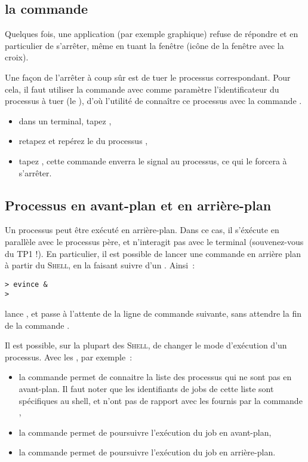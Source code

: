 \documentclass[11pt,a4paper]{article}
\newcommand{\shell}{\textsc{Shell}}
\begin{document}
\subsection{la commande }

Quelques fois, une application (par exemple graphique) refuse de répondre et en
particulier de s'arrêter, même en tuant la fenêtre (icône de la fenêtre avec
la croix).

Une façon de l'arrêter à coup sûr est de tuer le
processus correspondant. Pour cela, il faut utiliser la commande  avec
comme paramètre l'identificateur du processus à tuer (le ), d'où
l'utilité de connaître ce processus avec la commande .

\begin{maw}
\begin{itemize}
  \item dans un terminal, tapez ,
  \item retapez  et repérez le  du processus
        ,
  \item tapez , cette commande enverra le signal 
        au processus, ce qui le forcera à s'arrêter.
\end{itemize}
\end{maw}

\subsection{Processus en avant-plan et en arrière-plan}

Un processus peut être exécuté en arrière-plan. Dans ce cas, il s'éxécute en
parallèle avec le processus père, et n'interagit pas avec le terminal
(souvenez-vous du TP1 !).
En particulier, il est possible de lancer une commande en arrière plan à
partir du \shell, en la faisant suivre d'un \cmd{\&}. Ainsi~:

\begin{verbatim}
> evince &
>
\end{verbatim}

lance , et passe à l'attente de la ligne de commande suivante,
sans attendre la fin de la commande .

Il est possible, sur la plupart des \shell, de changer le mode d'exécution
d'un processus. Avec les , par exemple~:

\begin{itemize}
  \item la commande  permet de connaitre la liste des processus qui
        ne sont pas en avant-plan. Il faut noter que les identifiants de jobs
        de cette liste sont spécifiques au shell, et n'ont pas de rapport avec
        les  fournis par la commande , 
  \item la commande  permet de poursuivre l'exécution du job
         en avant-plan, 
  \item la commande  permet de poursuivre l'exécution du job
         en arrière-plan.
\end{itemize}
\end{document}
